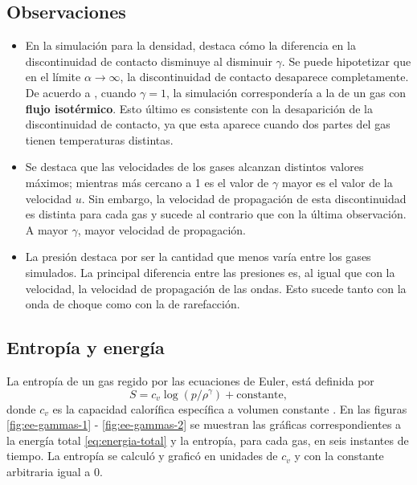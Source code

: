 \subsection{Observaciones}
\begin{itemize}
	\item En la simulación para la densidad, destaca cómo la diferencia en la discontinuidad de contacto disminuye al disminuir $\gamma$. Se puede hipotetizar que en el límite $\alpha \rightarrow \infty$, la discontinuidad de contacto desaparece completamente. De acuerdo a \cite{LeVeque}, cuando $\gamma = 1$, la simulación correspondería a la de un gas con \textbf{flujo isotérmico}. Esto último es consistente con la desaparición de la discontinuidad de contacto, ya que esta aparece cuando dos partes del gas tienen temperaturas distintas.
	\item Se destaca que las velocidades de los gases alcanzan distintos valores máximos; mientras más cercano a 1 es el valor de $\gamma$ mayor es el valor de la velocidad $u$. Sin embargo, la velocidad de propagación de esta discontinuidad es distinta para cada gas y sucede al contrario que con la última observación. A mayor $\gamma$, mayor velocidad de propagación.
	\item La presión destaca por ser la cantidad que menos varía entre los gases simulados. La principal diferencia entre las presiones es, al igual que con la velocidad, la velocidad de propagación de las ondas. Esto sucede tanto con la onda de choque como con la de rarefacción.
\end{itemize}

\subsection{Entropía y energía}
La entropía de un gas regido por las ecuaciones de Euler, está definida por
\begin{equation}
	S = c_{v}\log(p/\rho^{\gamma}) + \text{constante},
\end{equation}
donde $c_v$ es la capacidad calorífica específica a volumen constante \cite{LeVeque}. En las figuras \ref{fig:ee-gammas-1} - \ref{fig:ee-gammas-2} se muestran las gráficas correspondientes a la energía total \eqref{eq:energia-total} y la entropía, para cada gas, en seis instantes de tiempo. La entropía se calculó y graficó en unidades de $c_v$ y con la constante arbitraria igual a 0.


